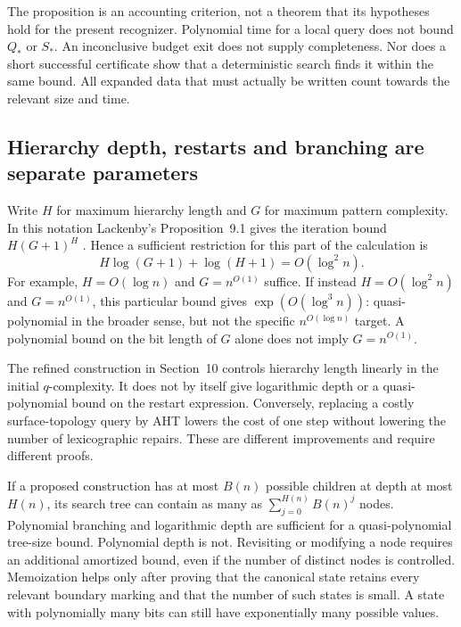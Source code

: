 The proposition is an accounting criterion, not a theorem that its
hypotheses hold for the present recognizer. Polynomial time for a local
query does not bound $Q_*$ or $S_*$. An inconclusive budget exit does not
supply completeness. Nor does a short successful certificate show that a
deterministic search finds it within the same bound. All expanded data
that must actually be written count towards the relevant size and time.

\subsection{Hierarchy depth, restarts and branching are separate parameters}

Write $H$ for maximum hierarchy length and $G$ for maximum pattern
complexity. In this notation Lackenby's Proposition~9.1 gives the iteration
bound $H(G+1)^H$ \cite{lackenby2026}. Hence a sufficient restriction for
this part of the calculation is
\[
                 H\log(G+1)+\log(H+1)=O(\log^2 n).
\]
For example, $H=O(\log n)$ and $G=n^{O(1)}$ suffice. If instead
$H=O(\log^2 n)$ and $G=n^{O(1)}$, this particular bound gives
$\exp(O(\log^3 n))$: quasi-polynomial in the broader sense, but not the
specific $n^{O(\log n)}$ target. A polynomial bound on the bit length of
$G$ alone does not imply $G=n^{O(1)}$.

The refined construction in Section~10 controls hierarchy length linearly
in the initial $q$-complexity. It does not by itself give logarithmic
depth or a quasi-polynomial bound on the restart expression. Conversely,
replacing a costly surface-topology query by AHT lowers the cost of one
step without lowering the number of lexicographic repairs. These are
different improvements and require different proofs.

If a proposed construction has at most $B(n)$ possible children at depth
at most $H(n)$, its search tree can contain as many as
$\sum_{j=0}^{H(n)}B(n)^j$ nodes. Polynomial branching and logarithmic
depth are sufficient for a quasi-polynomial tree-size bound. Polynomial
depth is not. Revisiting or modifying a node requires an additional
amortized bound, even if the number of distinct nodes is controlled.
Memoization helps only after proving that the canonical state retains
every relevant boundary marking and that the number of such states is
small. A state with polynomially many bits can still have exponentially
many possible values.

